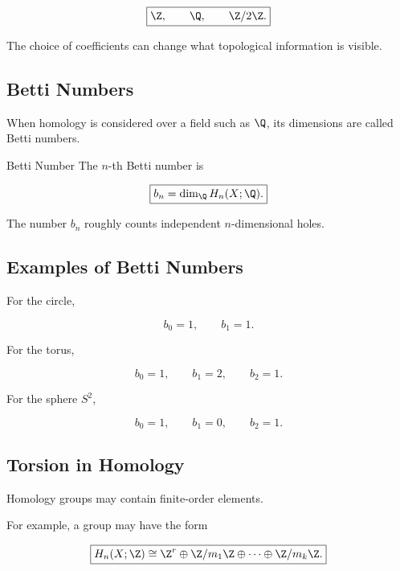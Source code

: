\[
\boxed{
\Z,
\qquad
\Q,
\qquad
\Z/2\Z.
}
\]

The choice of coefficients can change what topological information is
visible.

\subsection{Betti Numbers}
\label{subsec:betti-numbers}

When homology is considered over a field such as \(\Q\), its dimensions are
called Betti numbers.

\begin{definitionbox}{Betti Number}
The \(n\)-th Betti number is

\[
\boxed{
b_n
=
\dim_{\Q}H_n(X;\Q).
}
\]
\end{definitionbox}

The number \(b_n\) roughly counts independent \(n\)-dimensional holes.

\subsection{Examples of Betti Numbers}
\label{subsec:betti-number-examples}

For the circle,

\[
\boxed{
b_0=1,
\qquad
b_1=1.
}
\]

For the torus,

\[
\boxed{
b_0=1,
\qquad
b_1=2,
\qquad
b_2=1.
}
\]

For the sphere \(S^2\),

\[
\boxed{
b_0=1,
\qquad
b_1=0,
\qquad
b_2=1.
}
\]

\subsection{Torsion in Homology}
\label{subsec:torsion-homology}

Homology groups may contain finite-order elements.

For example, a group may have the form

\[
\boxed{
H_n(X;\Z)
\cong
\Z^r
\oplus
\Z/m_1\Z
\oplus\cdots\oplus
\Z/m_k\Z.
}
\]

